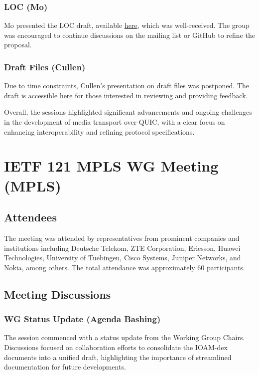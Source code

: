 \documentclass{article}
\begin{document}
\subsubsection{LOC (Mo)}
Mo presented the LOC draft, available \href{https://datatracker.ietf.org/doc/draft-mzanaty-moq-loc/}{here}, which was well-received. The group was encouraged to continue discussions on the mailing list or GitHub to refine the proposal.

\subsubsection{Draft Files (Cullen)}
Due to time constraints, Cullen's presentation on draft files was postponed. The draft is accessible \href{https://datatracker.ietf.org/doc/draft-jennings-moq-file/}{here} for those interested in reviewing and providing feedback.

Overall, the sessions highlighted significant advancements and ongoing challenges in the development of media transport over QUIC, with a clear focus on enhancing interoperability and refining protocol specifications.



\newpage

\section{IETF 121 MPLS WG Meeting (MPLS)}

\subsection{Attendees}
The meeting was attended by representatives from prominent companies and institutions including Deutsche Telekom, ZTE Corporation, Ericsson, Huawei Technologies, University of Tuebingen, Cisco Systems, Juniper Networks, and Nokia, among others. The total attendance was approximately 60 participants.

\subsection{Meeting Discussions}

\subsubsection{WG Status Update (Agenda Bashing)}
The session commenced with a status update from the Working Group Chairs. Discussions focused on collaboration efforts to consolidate the IOAM-dex documents into a unified draft, highlighting the importance of streamlined documentation for future developments.
\end{document}
